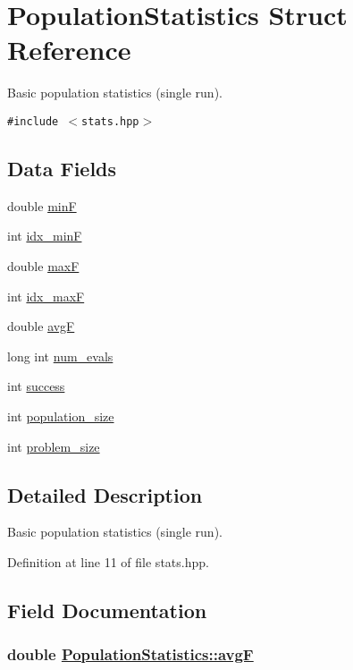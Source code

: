 \hypertarget{struct_population_statistics}{
\section{Population\-Statistics Struct Reference}
\label{struct_population_statistics}
}
Basic population statistics (single run).  


{\tt \#include $<$stats.hpp$>$}

\subsection*{Data Fields}
\begin{CompactItemize}
\item 
double \hyperlink{struct_population_statistics_920d3ac10405c9d918decde3aba6f454}{min\-F}
\item 
int \hyperlink{struct_population_statistics_b425e54cf69ede6fe860c016dc70a15e}{idx\_\-min\-F}
\item 
double \hyperlink{struct_population_statistics_66e61b5383e85b625ec35ae77fbc3cd2}{max\-F}
\item 
int \hyperlink{struct_population_statistics_f65947f9aa3f3b1785247463d276167f}{idx\_\-max\-F}
\item 
double \hyperlink{struct_population_statistics_9aec9d463bbfcb7ef9044839197f7f6c}{avg\-F}
\item 
long int \hyperlink{struct_population_statistics_e8cbb263884a6ad09eab3732d22b2b6d}{num\_\-evals}
\item 
int \hyperlink{struct_population_statistics_b23768923d2792507a49607eb5ea58ed}{success}
\item 
int \hyperlink{struct_population_statistics_f5c520ade3e08bca692219445933b6b3}{population\_\-size}
\item 
int \hyperlink{struct_population_statistics_e1a5a08b7e0915388945ae6a7b435140}{problem\_\-size}
\end{CompactItemize}


\subsection{Detailed Description}
Basic population statistics (single run). 



Definition at line 11 of file stats.hpp.

\subsection{Field Documentation}
\hypertarget{struct_population_statistics_9aec9d463bbfcb7ef9044839197f7f6c}{
\subsubsection[avgF]{\setlength{\rightskip}{0pt plus 5cm}double \hyperlink{struct_population_statistics_9aec9d463bbfcb7ef9044839197f7f6c}{Population\-Statistics::avg\-F}}}
\label{struct_population_statistics_9aec9d463bbfcb7ef9044839197f7f6c}




